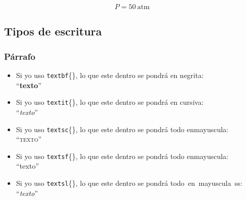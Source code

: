 \documentclass[12pt,a4paper]{article}
\begin{document}
\begin{equation}
\label{Atmos}
P=50~\text{atm}
\end{equation}

\subsection{Tipos de escritura}
\subsubsection*{Párrafo}

\begin{itemize}
\item Si yo uso \texttt{textbf}\{\}, lo que este dentro se pondrá en negrita:\\``\textbf{texto}''

\item Si yo uso \texttt{textit}\{\}, lo que este dentro se pondrá en cursiva:\\``\textit{texto}''

\item Si yo uso \texttt{textsc}\{\}, lo que este dentro se pondrá todo en\linebreak mayuscula:\\``\textsc{texto}''

\item Si yo uso \texttt{textsf}\{\}, lo que este dentro se pondrá todo en\linebreak mayuscula:\\``\textsf{texto}''

\item Si yo uso \texttt{textsl}\{\}, lo que este dentro se pondrá todo~en~mayuscula~ss:\\``\textsl{texto}''

\end{itemize}
\end{document}
